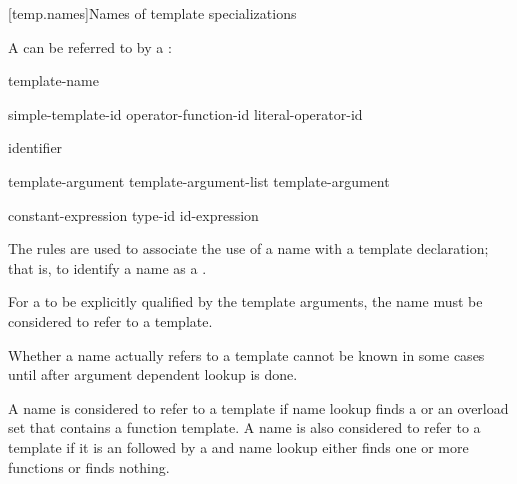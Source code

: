 [temp.names]{Names of template specializations}

\pnum
A  can be referred to by a
:

\begin{bnf}
\br
  template-name \terminal{<}  \terminal{>}
\end{bnf}

\begin{bnf}
\br
  simple-template-id\br
  operator-function-id \terminal{<}  \terminal{>}\br
  literal-operator-id \terminal{<}  \terminal{>}
\end{bnf}

\begin{bnf}
\br
  identifier
\end{bnf}

\begin{bnf}
\br
  template-argument \br
  template-argument-list \terminal{,} template-argument 
\end{bnf}

\begin{bnf}
\br
  constant-expression\br
  type-id\br
  id-expression
\end{bnf}

\begin{note}
The  rules are used to associate the use of
a name with a template declaration;
that is, to identify a name as a
.
\end{note}

\pnum
For a
to be explicitly qualified by the template arguments,
the name must be considered to refer to a template.
\begin{note}
Whether a name actually refers to a template
cannot be known in some cases
until after argument dependent lookup is done.
\end{note}
A name is considered to refer to a template if
name lookup finds
a 
or an overload set that contains a function template.
A name is also considered to refer to a template if
it is an 
followed by a \tcode{<}
and name lookup either finds one or more functions or finds nothing.

